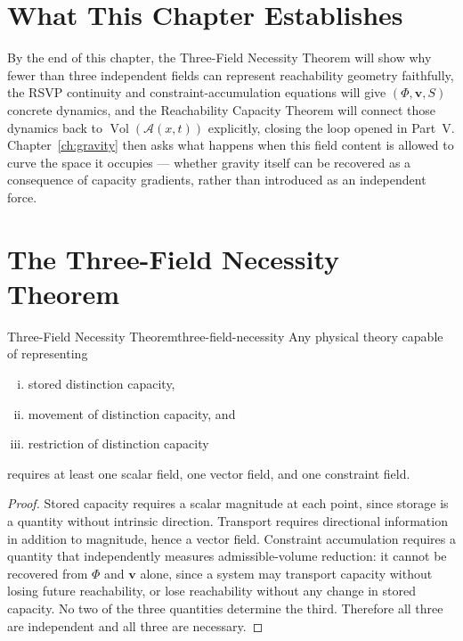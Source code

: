 \documentclass[12pt,twoside,openright]{book}
\newcommand{\adm}{\mathcal{A}}
\newcommand{\Vol}{\operatorname{Vol}}
\begin{document}
\section{What This Chapter Establishes}
\label{sec:ch16-preview}

By the end of this chapter, the Three-Field Necessity Theorem
will show why fewer than three independent fields can
represent reachability geometry faithfully, the RSVP
continuity and constraint-accumulation equations will give
$(\Phi,\mathbf{v},S)$ concrete dynamics, and the Reachability
Capacity Theorem will connect those dynamics back to
$\Vol(\adm(x,t))$ explicitly, closing the loop opened in
Part~V. Chapter~\ref{ch:gravity} then asks what happens when
this field content is allowed to curve the space it occupies
--- whether gravity itself can be recovered as a consequence
of capacity gradients, rather than introduced as an
independent force.

\section{The Three-Field Necessity Theorem}
\label{sec:ch16-necessity}

\begin{theorem}{Three-Field Necessity Theorem}{three-field-necessity}
  Any physical theory capable of representing
  \begin{enumerate}[(i)]
    \item stored distinction capacity,
    \item movement of distinction capacity, and
    \item restriction of distinction capacity
  \end{enumerate}
  requires at least one scalar field, one vector field,
  and one constraint field.
\end{theorem}

\begin{proof}
  Stored capacity requires a scalar magnitude at each
  point, since storage is a quantity without intrinsic
  direction. Transport requires directional information
  in addition to magnitude, hence a vector field. Constraint
  accumulation requires a quantity that independently
  measures admissible-volume reduction: it cannot be
  recovered from $\Phi$ and $\mathbf{v}$ alone, since a
  system may transport capacity without losing future
  reachability, or lose reachability without any change in
  stored capacity. No two of the three quantities determine
  the third. Therefore all three are independent and all
  three are necessary.
\end{proof}
\end{document}
